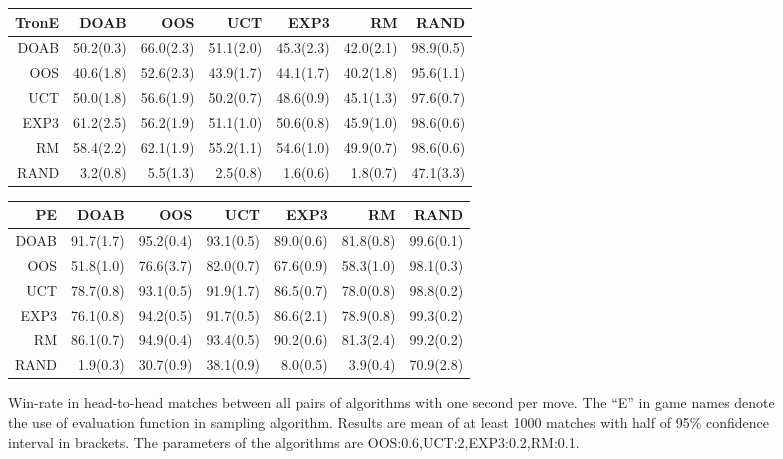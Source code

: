 \begin{figure}
\begin{scriptsize}
\begin{tabular}{|r|rrrrrr|}
TronE&DOAB&OOS&UCT&EXP3&RM&RAND\\\hline
DOAB&50.2(0.3)&66.0(2.3)&51.1(2.0)&45.3(2.3)&42.0(2.1)&98.9(0.5)\\
OOS&40.6(1.8)&52.6(2.3)&43.9(1.7)&44.1(1.7)&40.2(1.8)&95.6(1.1)\\
UCT&50.0(1.8)&56.6(1.9)&50.2(0.7)&48.6(0.9)&45.1(1.3)&97.6(0.7)\\
EXP3&61.2(2.5)&56.2(1.9)&51.1(1.0)&50.6(0.8)&45.9(1.0)&98.6(0.6)\\
RM&58.4(2.2)&62.1(1.9)&55.2(1.1)&54.6(1.0)&49.9(0.7)&98.6(0.6)\\
RAND&3.2(0.8)&5.5(1.3)&2.5(0.8)&1.6(0.6)&1.8(0.7)&47.1(3.3)\\
\hline
\end{tabular}
\begin{tabular}{|r|rrrrrr|}\hline
PE&DOAB&OOS&UCT&EXP3&RM&RAND\\\hline
DOAB&91.7(1.7)&95.2(0.4)&93.1(0.5)&89.0(0.6)&81.8(0.8)&99.6(0.1)\\
OOS&51.8(1.0)&76.6(3.7)&82.0(0.7)&67.6(0.9)&58.3(1.0)&98.1(0.3)\\
UCT&78.7(0.8)&93.1(0.5)&91.9(1.7)&86.5(0.7)&78.0(0.8)&98.8(0.2)\\
EXP3&76.1(0.8)&94.2(0.5)&91.7(0.5)&86.6(2.1)&78.9(0.8)&99.3(0.2)\\
RM&86.1(0.7)&94.9(0.4)&93.4(0.5)&90.2(0.6)&81.3(2.4)&99.2(0.2)\\
RAND&1.9(0.3)&30.7(0.9)&38.1(0.9)&8.0(0.5)&3.9(0.4)&70.9(2.8)\\
\hline
\end{tabular}
\end{scriptsize}
\caption{Win-rate in head-to-head matches between all pairs of algorithms with one second per move. The ``E'' in game names denote the use of evaluation function in sampling algorithm. Results are mean of at least 1000 matches with half of 95\% confidence interval in brackets. The parameters of the algorithms are OOS:0.6,UCT:2,EXP3:0.2,RM:0.1.}\label{fig:matches1}
\end{figure}



